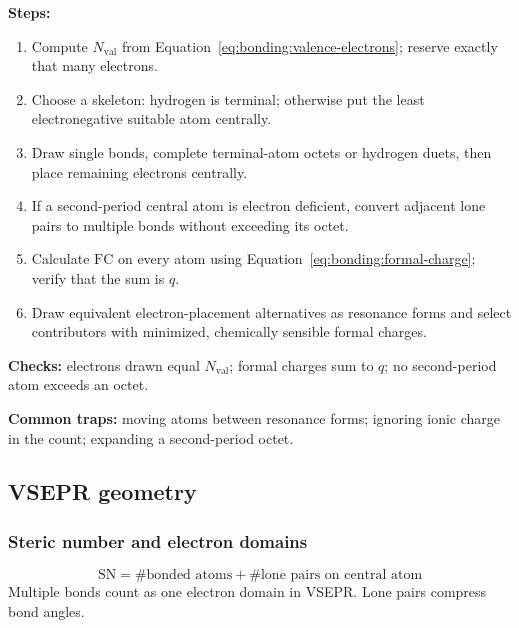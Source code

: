 \textbf{Steps:}
\begin{enumerate}
    \item Compute \(N_{\mathrm{val}}\) from Equation~\ref{eq:bonding:valence-electrons}; reserve exactly that many electrons.
    \item Choose a skeleton: hydrogen is terminal; otherwise put the least electronegative suitable atom centrally.
    \item Draw single bonds, complete terminal-atom octets or hydrogen duets, then place remaining electrons centrally.
    \item If a second-period central atom is electron deficient, convert adjacent lone pairs to multiple bonds without exceeding its octet.
    \item Calculate \(\mathrm{FC}\) on every atom using Equation~\ref{eq:bonding:formal-charge}; verify that the sum is \(q\).
    \item Draw equivalent electron-placement alternatives as resonance forms and select contributors with minimized, chemically sensible formal charges.
\end{enumerate}

\textbf{Checks:} electrons drawn equal \(N_{\mathrm{val}}\); formal charges sum to \(q\); no second-period atom exceeds an octet.

\textbf{Common traps:} moving atoms between resonance forms; ignoring ionic charge in the count; expanding a second-period octet.

\subsection{VSEPR geometry}

\subsubsection{Steric number and electron domains}
\begin{equation}
\label{eq:bonding:steric-number}
\mathrm{SN}=\#\text{bonded atoms}+\#\text{lone pairs on central atom}
\end{equation}
Multiple bonds count as one electron domain in VSEPR. Lone pairs compress bond angles.

